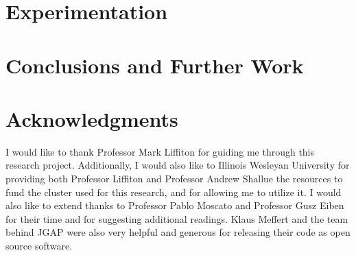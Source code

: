 \documentclass{article}
\begin{document}

\section{Experimentation}
\label{sec:experimentation}



\section{Conclusions and Further Work}
\label{sec:conclusions}



\section*{Acknowledgments}
I would like to thank Professor Mark Liffiton for guiding me through this research project. Additionally, I would also like to Illinois Wesleyan University for providing both Professor Liffiton and Professor Andrew Shallue the resources to fund the cluster used for this research, and for allowing me to utilize it. I would also like to extend thanks to Professor Pablo Moscato and Professor Gusz Eiben for their time and for suggesting additional readings. Klaus Meffert and the team behind JGAP were also very helpful and generous for releasing their code as open source software. 




\end{document}
